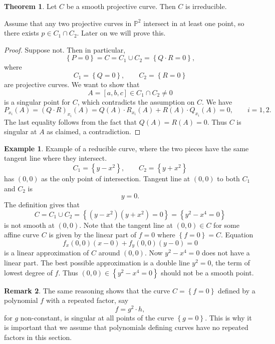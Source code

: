 \documentclass{article}
\renewcommand{\P}{\mathbb{P}}
\newcommand{\rb}[1]{\left( #1 \right)}
\renewcommand{\sb}[1]{\left[ #1 \right]}
\newcommand{\cb}[1]{\left\{ #1 \right\}}
\theoremstyle{definition}\newtheorem{definition}{Definition}[section]
\theoremstyle{definition}\newtheorem{notation}[definition]{Notation}
\theoremstyle{definition}\newtheorem{remark}[definition]{Remark}
\theoremstyle{definition}\newtheorem{example1}[definition]{Example}
\theoremstyle{definition}\newtheorem{fact}{Fact}
\theoremstyle{definition}\newtheorem{exercise}{Exercise}
\theoremstyle{definition}\newtheorem*{example2}{Example}
\newtheorem{theorem}[definition]{Theorem}
\begin{document}
\begin{theorem}
\label{thm:7.9}
Let $ C $ be a smooth projective curve. Then $ C $ is irreducible.
\end{theorem}

Assume that any two projective curves in $ \P^2 $ intersect in at least one point, so there exists $ p \in C_1 \cap C_2 $. Later on we will prove this.

\begin{proof}
Suppose not. Then in particular,
$$ \cb{P = 0} = C = C_1 \cup C_2 = \cb{Q \cdot R = 0}, $$
where
$$ C_1 = \cb{Q = 0}, \qquad C_2 = \cb{R = 0} $$
are projective curves. We want to show that
$$ A = \sb{a, b, c} \in C_1 \cap C_2 \ne 0 $$
is a singular point for $ C $, which contradicts the assumption on $ C $. We have
$$ P_{x_i}\rb{A} = \rb{Q \cdot R}_{x_i}\rb{A} = Q\rb{A} \cdot R_{x_i}\rb{A} + R\rb{A} \cdot Q_{x_i}\rb{A} = 0, \qquad i = 1, 2. $$
The last equality follows from the fact that $ Q\rb{A} = R\rb{A} = 0 $. Thus $ C $ is singular at $ A $ as claimed, a contradiction.
\end{proof}


\begin{example2}
Example of a reducible curve, where the two pieces have the same tangent line where they intersect.
$$ C_1 = \cb{y - x^2}, \qquad C_2 = \cb{y + x^2} $$
has $ \rb{0, 0} $ as the only point of intersection. Tangent line at $ \rb{0, 0} $ to both $ C_1 $ and $ C_2 $ is
$$ y = 0. $$
The definition gives that
$$ C = C_1 \cup C_2 = \cb{\rb{y - x^2}\rb{y + x^2} = 0} = \cb{y^2 - x^4 = 0} $$
is not smooth at $ \rb{0, 0} $. Note that the tangent line at $ \rb{0, 0} \in C $ for some affine curve $ C $ is given by the linear part of $ f = 0 $ where $ \cb{f = 0} = C $. Equation
$$ f_x\rb{0, 0}\rb{x - 0} + f_y\rb{0, 0}\rb{y - 0} = 0 $$
is a linear approximation of $ C $ around $ \rb{0, 0} $. Now $ y^2 - x^4 = 0 $ does not have a linear part. The best possible approximation is a double line $ y^2 = 0 $, the term of lowest degree of $ f $. Thus $ \rb{0, 0} \in \cb{y^2 - x^4 = 0} $ should not be a smooth point.
\end{example2}

\begin{remark}
The same reasoning shows that the curve $ C = \cb{f = 0} $ defined by a polynomial $ f $ with a repeated factor, say
$$ f = g^2 \cdot h, $$
for $ g $ non-constant, is singular at all points of the curve $ \cb{g = 0} $. This is why it is important that we assume that polynomials defining curves have no repeated factors in this section.
\end{remark}
\end{document}
